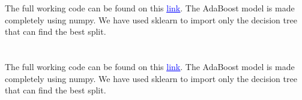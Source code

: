 \documentclass{homework}
\begin{document}
\section{}
The full working code can be found on this \href{https://github.com/Anshul-Sangrame/Handouts-2022-2023/blob/main/Boosting%20and%20bagging/code/main.ipynb}{\textcolor{blue}{\underline{link}}}. The AdaBoost model is made completely using numpy. We have used sklearn to import only the decision tree that can find the best split.

\section{}
The full working code can be found on this \href{https://github.com/Anshul-Sangrame/Handouts-2022-2023/blob/main/Boosting%20and%20bagging/code/main.ipynb}{\textcolor{blue}{\underline{link}}}. The AdaBoost model is made completely using numpy. We have used sklearn to import only the decision tree that can find the best split.

\end{document}
